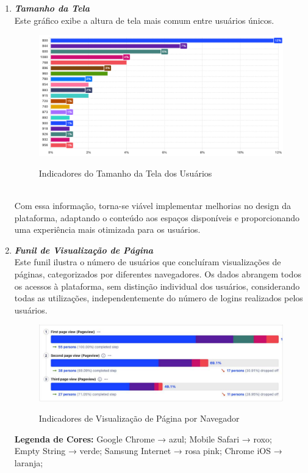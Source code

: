 \begin{enumerate}
\begin{enumerate}
\item\textit{\textbf{Tamanho da Tela}}\\
 Este gráfico exibe a altura de tela mais comum entre usuários únicos.\\
\begin{figure}[!ht]
    \centering
    \includegraphics[scale=0.45]{latex/figuras/tela.pdf}
    \label{tela}
    \caption[Tamanho da Tela]{Indicadores do Tamanho da Tela dos Usuários}
    \label{fig:enter-label}
\end{figure}\\
Com essa informação, torna-se viável implementar melhorias no design da plataforma, adaptando o conteúdo aos espaços disponíveis e proporcionando uma experiência mais otimizada para os usuários.
 
\item\textit{\textbf{Funil de Visualização de Página}}\\
 Este funil ilustra o número de usuários que concluíram visualizações de páginas, categorizados por diferentes navegadores. Os dados abrangem todos os acessos à plataforma, sem distinção individual dos usuários, considerando todas as utilizações, independentemente do número de logins realizados pelos usuários.\\
 
\begin{figure}[!ht]
    \centering
    \includegraphics[scale=0.45]{latex/figuras/page.pdf}
    \label{page}
    \caption[Funil de Visualização]{Indicadores de Visualização de Página por Navegador}
    \label{fig:enter-label}
\end{figure}
\textbf{\textbf{Legenda de Cores:}} Google Chrome → azul; Mobile Safari → roxo;\\Empty String → verde; Samsung Internet → rosa pink; Chrome iOS → laranja;\\


\end{enumerate}
\end{enumerate}
